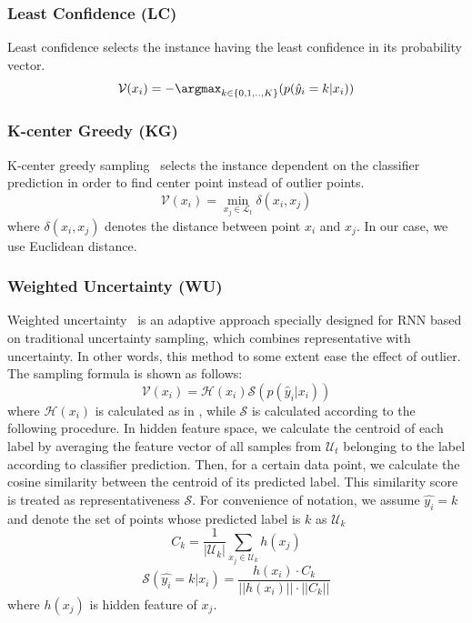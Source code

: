 \subsubsection{Least Confidence (LC)}
    Least confidence selects the instance having the least confidence in its probability vector.
    \begin{equation}
    \mathcal{V}(x_i) = - \argmax_{k \in \{0,1,..,K\}}(p(\hat{y}_i=k|x_i)) 
    \end{equation}
    

\subsubsection{K-center Greedy (KG)}
    K-center greedy sampling~\cite{sener2017geometric} selects the instance dependent on the classifier prediction in order to find center point instead of outlier points.
    \begin{equation}
        \mathcal{V}(x_i) = \min_{x_j \in \mathcal{L}_t}\delta(x_i,x_j)
    \end{equation}
    where $\delta(x_i,x_j)$ denotes the distance between point $x_i$ and $x_j$. In our case, we use Euclidean distance.
    
\subsubsection{Weighted Uncertainty (WU)}
    Weighted uncertainty~\cite{zhao2017deep} is an adaptive approach specially designed for RNN based on traditional uncertainty sampling, which combines representative with uncertainty. In other words, this method to some extent ease the effect of outlier. The sampling formula is shown as follows:
    \begin{equation}
    \mathcal{V}(x_i) = \mathcal{H}(x_i) \mathcal{S}(p(\hat{y}_i|x_i))
    \end{equation}
    where $\mathcal{H}(x_i)$ is calculated as in , while $\mathcal{S}$ is calculated according to the following procedure. 
    In hidden feature space, we calculate the centroid of each label by averaging the feature vector of all samples from $\mathcal{U}_t$ belonging to the label according to classifier prediction. Then, for a certain data point, we calculate the cosine similarity between the centroid of its predicted label. This similarity score is treated as representativeness $\mathcal{S}$.  For convenience of notation, we assume $\hat{y_i} = k$ and denote the set of points whose predicted label is $k$ as $\mathcal{U}_k$
    \begin{equation}
    C_k = \frac{1}{|\mathcal{U}_k|} \sum_{x_j \in \mathcal{U}_k} h(x_j)
    \end{equation}
    \begin{equation}
    \mathcal{S}(\hat{y_i} = k|x_i) = \frac{h(x_i) \cdot C_k}{||h(x_i)|| \cdot ||C_k||}         
    \end{equation}
where $h(x_j)$ is hidden feature of $x_j$.

